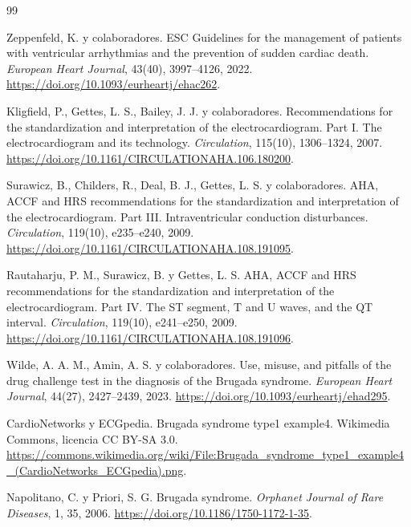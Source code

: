 \cleardoublepage
\begin{thebibliography}{99}

Zeppenfeld, K. y colaboradores.
 ESC Guidelines for the management of patients with ventricular arrhythmias and the prevention of sudden cardiac death.
\newblock \emph{European Heart Journal}, 43(40), 3997--4126, 2022.
\newblock \url{https://doi.org/10.1093/eurheartj/ehac262}.

Kligfield, P., Gettes, L. S., Bailey, J. J. y colaboradores.
\newblock Recommendations for the standardization and interpretation of the electrocardiogram. Part I. The electrocardiogram and its technology.
\newblock \emph{Circulation}, 115(10), 1306--1324, 2007.
\newblock \url{https://doi.org/10.1161/CIRCULATIONAHA.106.180200}.

Surawicz, B., Childers, R., Deal, B. J., Gettes, L. S. y colaboradores.
\newblock AHA, ACCF and HRS recommendations for the standardization and interpretation of the electrocardiogram. Part III. Intraventricular conduction disturbances.
\newblock \emph{Circulation}, 119(10), e235--e240, 2009.
\newblock \url{https://doi.org/10.1161/CIRCULATIONAHA.108.191095}.

Rautaharju, P. M., Surawicz, B. y Gettes, L. S.
\newblock AHA, ACCF and HRS recommendations for the standardization and interpretation of the electrocardiogram. Part IV. The ST segment, T and U waves, and the QT interval.
\newblock \emph{Circulation}, 119(10), e241--e250, 2009.
\newblock \url{https://doi.org/10.1161/CIRCULATIONAHA.108.191096}.

Wilde, A. A. M., Amin, A. S. y colaboradores.
\newblock Use, misuse, and pitfalls of the drug challenge test in the diagnosis of the Brugada syndrome.
\newblock \emph{European Heart Journal}, 44(27), 2427--2439, 2023.
\newblock \url{https://doi.org/10.1093/eurheartj/ehad295}.

CardioNetworks y ECGpedia.
\newblock Brugada syndrome type1 example4.
\newblock Wikimedia Commons, licencia CC BY-SA 3.0.
\newblock \url{https://commons.wikimedia.org/wiki/File:Brugada_syndrome_type1_example4_(CardioNetworks_ECGpedia).png}.

Napolitano, C. y Priori, S. G.
\newblock Brugada syndrome.
\newblock \emph{Orphanet Journal of Rare Diseases}, 1, 35, 2006.
\newblock \url{https://doi.org/10.1186/1750-1172-1-35}.


\end{thebibliography}
